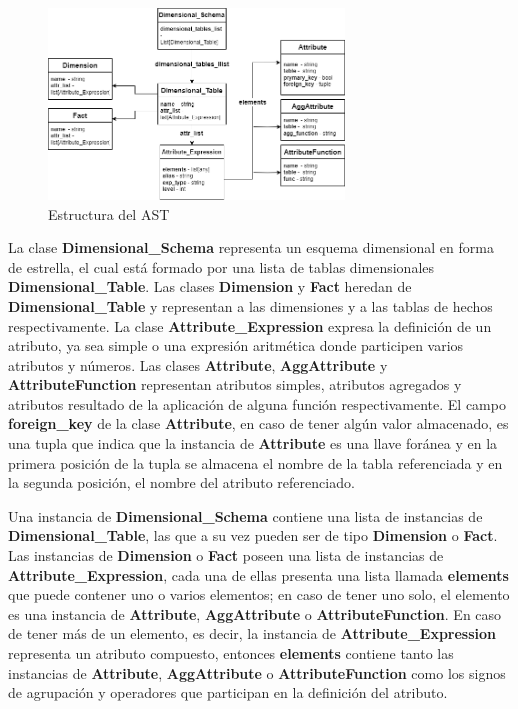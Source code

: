 \begin{figure}[htb]
    \centering
    \includegraphics[width=0.7\textwidth]{Graphics/ast.png}
    \caption{Estructura del AST}
    \label{fig:ast}
\end{figure}

La clase \textbf{Dimensional\_Schema} representa un esquema dimensional en forma de estrella, el cual est\'a formado por una lista de tablas 
dimensionales \textbf{Dimensional\_Table}. Las clases \textbf{Dimension} y \textbf{Fact} heredan de \textbf{Dimensional\_Table} 
y representan a las dimensiones y a las tablas de hechos respectivamente. La clase \textbf{Attribute\_Expression} expresa 
la definición de un atributo, ya sea simple o una expresión aritmética donde participen varios atributos y n\'umeros. 
Las clases \textbf{Attribute}, \textbf{AggAttribute} y \textbf{AttributeFunction} representan atributos simples, atributos 
agregados y atributos resultado de la aplicación de alguna función respectivamente. El campo \textbf{foreign\_key} de 
la clase \textbf{Attribute}, en caso de tener alg\'un valor almacenado, es una tupla que indica que la instancia 
de \textbf{Attribute} es una llave for\'anea y en la primera posición de la tupla se almacena el nombre de la tabla referenciada y 
en la segunda posición, el nombre del atributo referenciado.

Una instancia de \textbf{Dimensional\_Schema} contiene una lista de instancias de \textbf{Dimensional\_Table}, las que a su vez pueden ser de tipo 
\textbf{Dimension} o \textbf{Fact}. Las instancias de \textbf{Dimension} o \textbf{Fact} poseen una lista de instancias de \textbf{Attribute\_Expression}, cada 
una de ellas presenta 
una lista llamada \textbf{elements} que puede contener uno o varios elementos; en caso de tener uno solo, el elemento 
es una instancia de \textbf{Attribute}, \textbf{AggAttribute} o \textbf{AttributeFunction}. En caso de tener 
m\'as de un elemento, es decir, la instancia de \textbf{Attribute\_Expression} representa un atributo compuesto, entonces 
\textbf{elements} contiene tanto las instancias de \textbf{Attribute}, \textbf{AggAttribute} o \textbf{AttributeFunction} como 
los signos de agrupación y operadores que participan en la definición del atributo.

